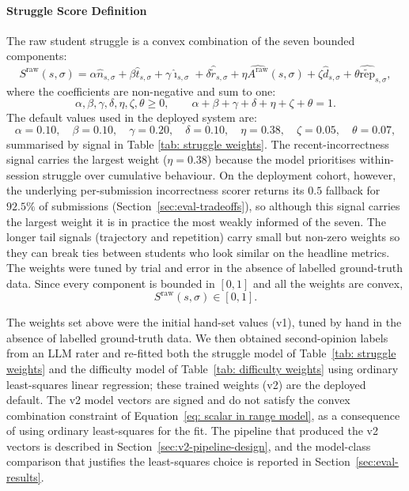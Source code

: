 \paragraph{Struggle Score Definition}
The raw student struggle is a convex combination of the seven bounded components:
\begin{equation}
    \label{eq:struggle-raw}
    S^{\mathrm{raw}}(s,\sigma)
    = \alpha \hat{n}_{s,\sigma}
    + \beta  \hat{t}_{s,\sigma}
    + \gamma \hat{\imath}_{s,\sigma}
    + \delta \hat{\tilde{r}}_{s,\sigma}
    + \eta   \widehat{A^{\mathrm{raw}}}(s,\sigma)
    + \zeta  \hat{d}_{s,\sigma}
    + \theta \widehat{\tilde{\mathrm{rep}}}_{s,\sigma},
\end{equation}
where the coefficients are non-negative and sum to one:
\begin{equation*}
    \alpha,\beta,\gamma,\delta,\eta,\zeta,\theta \geqslant 0,
    \qquad
    \alpha+\beta+\gamma+\delta+\eta+\zeta+\theta = 1.
\end{equation*}
The default values used in the deployed system are:
\begin{equation*}
    \alpha = 0.10, \quad
    \beta = 0.10, \quad
    \gamma = 0.20, \quad
    \delta = 0.10, \quad
    \eta = 0.38, \quad
    \zeta = 0.05, \quad
    \theta = 0.07,
\end{equation*}
summarised by signal in Table \ref{tab: struggle weights}. The recent-incorrectness signal carries the largest weight ($\eta = 0.38$) because the model prioritises within-session struggle over cumulative behaviour. On the deployment cohort, however, the underlying per-submission incorrectness scorer returns its $0.5$ fallback for $92.5\%$ of submissions (Section~\ref{sec:eval-tradeoffs}), so although this signal carries the largest weight it is in practice the most weakly informed of the seven.
The longer tail signals (trajectory and repetition) carry small but non-zero weights so they can break ties between students who look similar on the headline metrics. 
The weights were tuned by trial and error in the absence of labelled ground-truth data. 
Since every component is bounded in $[0,1]$ and all the weights are convex,
\begin{equation*}
    S^{\mathrm{raw}}(s,\sigma) \in [0,1].
\end{equation*}

The weights set above were the initial hand-set values (v1), tuned by hand in the absence of labelled ground-truth data. We then obtained second-opinion labels from an LLM rater and re-fitted both the struggle model of Table~\ref{tab: struggle weights} and the difficulty model of Table~\ref{tab: difficulty weights} using ordinary least-squares linear regression; these trained weights (v2) are the deployed default.
The v2 model vectors are signed and do not satisfy the convex combination constraint of Equation~\ref{eq: scalar in range model}, as a consequence of using ordinary least-squares for the fit. The pipeline that produced the v2 vectors is described in Section~\ref{sec:v2-pipeline-design}, and the model-class comparison that justifies the least-squares choice is reported in Section~\ref{sec:eval-results}.

